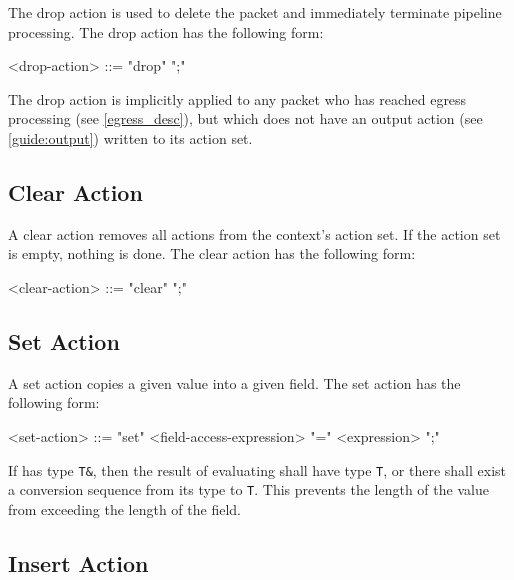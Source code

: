 The drop action is used to delete the packet and immediately terminate pipeline processing. The drop action has the following form:

\begin{minip}
\begin{grammar}
<drop-action> ::= "drop" ";"
\end{grammar}
\end{minip}

The drop action is implicitly applied to any packet who has reached egress processing (see \ref{egress_desc}), but which does not have an output action (see \ref{guide:output}) written to its action set.

\subsection{Clear Action} \label{guide:clear}

A clear action removes all actions from the context's action set. If the action set is empty, nothing is done. The clear action has the following form:

\begin{minip}
\begin{grammar}
<clear-action> ::= "clear" ";"
\end{grammar}
\end{minip}

\subsection{Set Action} \label{guide:set_field}

A set action copies a given value into a given field. The set action has the following form:

\begin{minip}
\begin{grammar}
<set-action> ::= "set" <field-access-expression> "=" <expression> ";"
\end{grammar}
\end{minip}

If  has type \texttt{T\&}, then the result of evaluating  shall have type \texttt{T}, or there shall exist a conversion sequence from its type to \texttt{T}. This prevents the length of the value from exceeding the length of the field.

\subsection{Insert Action} \label{guide:insert_flow}

